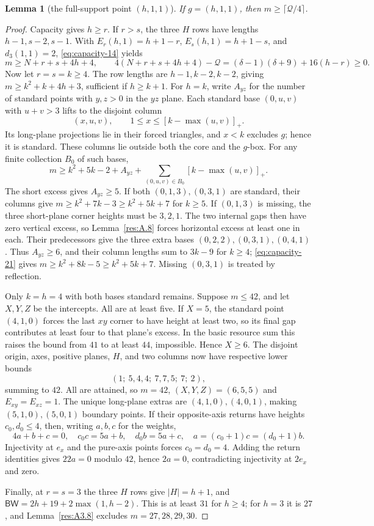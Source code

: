 \documentclass[11pt]{article}
\newtheorem{lemma}[theorem]{Lemma}
\theoremstyle{definition}
\theoremstyle{remark}
\theoremstyle{plain}
\begin{document}
\begin{lemma}[the full-support point $(h,1,1)$]\label{res:A3.6}
If $g=(h,1,1)$, then $m\ge\lceil \mathcal Q/4\rceil$.
\end{lemma}
\begin{proof}
Capacity gives $h\ge r$.  If $r>s$, the three $H$ rows have lengths
$h-1,s-2,s-1$.  With $E_r(h,1)=h+1-r$, $E_s(h,1)=h+1-s$,
and $d_3(1,1)=2$, \eqref{eq:capacity-14} yields
\[
 m\ge N+r+s+4h+4,\qquad
 4(N+r+s+4h+4)-\mathcal Q=(\delta-1)(\delta+9)+16(h-r)\ge0.
\]
Now let $r=s=k\ge4$.  The row lengths are $h-1,k-2,k-2$, giving
$m\ge k^2+k+4h+3$, sufficient if $h\ge k+1$.
For $h=k$, write $A_{yz}$ for the number of standard points with $y,z>0$ in the $yz$ plane.
Each standard base $(0,u,v)$ with $u+v>3$ lifts to the disjoint column
\[
 (x,u,v),\qquad 1\le x\le[k-\max(u,v)]_+.
\]
Its long-plane projections lie in their forced triangles, and $x<k$
excludes $g$; hence it is standard.  These columns lie outside both the
core and the $g$-box.  For any finite collection $B_0$ of such bases,
\[
 m\ge k^2+5k-2+A_{yz}
       +\sum_{(0,u,v)\in B_0}[k-\max(u,v)]_+.\tag{3.21}\label{eq:capacity-21}
\]
The short excess gives $A_{yz}\ge5$.  If both $(0,1,3),(0,3,1)$ are
standard, their columns give $m\ge k^2+7k-3\ge k^2+5k+7$ for $k\ge5$.
If $(0,1,3)$ is missing, the three short-plane corner heights must be
$3,2,1$.  The two internal gaps then have zero vertical excess, so Lemma~\ref{res:A.8}
forces horizontal excess at least one in each.  Their predecessors
give the three extra bases $(0,2,2),(0,3,1),(0,4,1)$.
Thus $A_{yz}\ge6$, and their column lengths sum to $3k-9$ for $k\ge4$;
\eqref{eq:capacity-21} gives $m\ge k^2+8k-5\ge k^2+5k+7$.
Missing $(0,3,1)$ is treated by reflection.

Only $k=h=4$ with both bases standard remains.  Suppose $m\le42$,
and let $X,Y,Z$ be the intercepts.  All are at least five.
If $X=5$, the standard point $(4,1,0)$ forces the last $xy$ corner to
have height at least two, so its final gap contributes at least four
to that plane's excess.  In the basic resource sum this raises the
bound from $41$ to at least $44$, impossible.  Hence $X\ge6$.
The disjoint origin, axes, positive planes, $H$, and two columns now
have respective lower bounds
\[
 (1;\ 5,4,4;\ 7,7,5;\ 7;\ 2),
\]
summing to $42$.  All are attained, so $m=42$,
$(X,Y,Z)=(6,5,5)$ and $E_{xy}=E_{xz}=1$.
The unique long-plane extras are $(4,1,0),(4,0,1)$, making
$(5,1,0),(5,0,1)$ boundary points.  If their opposite-axis returns
have heights $c_0,d_0\le4$, then, writing $a,b,c$ for the weights,
\[
 4a+b+c=0,\quad c_0c=5a+b,\quad d_0b=5a+c,
 \quad a=(c_0+1)c=(d_0+1)b.
\]
Injectivity at $e_x$ and the pure-axis points forces $c_0=d_0=4$.
Adding the return identities gives $22a=0$ modulo $42$, hence $2a=0$,
contradicting injectivity at $2e_x$ and zero.

Finally, at $r=s=3$ the three $H$ rows give $|H|=h+1$, and
$\mathsf{BW}=2h+19+2\max(1,h-2)$.
This is at least $31$ for $h\ge4$; for $h=3$ it is $27$, and Lemma~\ref{res:A3.8}
excludes $m=27,28,29,30$. \end{proof}
\end{document}
